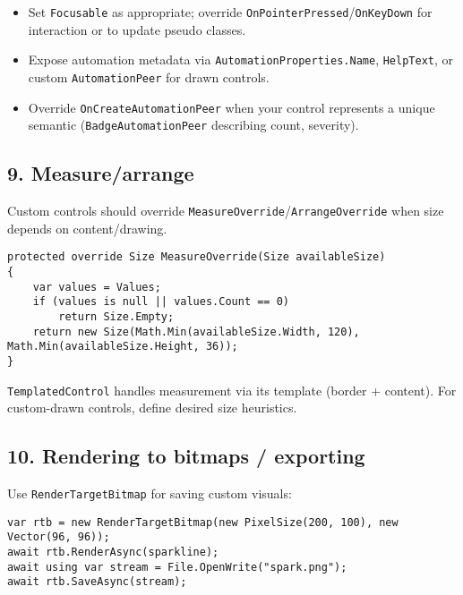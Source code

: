 \begin{itemize}
\tightlist
\item
  Set \passthrough{\lstinline!Focusable!} as appropriate; override
  \passthrough{\lstinline!OnPointerPressed!}/\passthrough{\lstinline!OnKeyDown!}
  for interaction or to update pseudo classes.
\item
  Expose automation metadata via
  \passthrough{\lstinline!AutomationProperties.Name!},
  \passthrough{\lstinline!HelpText!}, or custom
  \passthrough{\lstinline!AutomationPeer!} for drawn controls.
\item
  Override \passthrough{\lstinline!OnCreateAutomationPeer!} when your
  control represents a unique semantic
  (\passthrough{\lstinline!BadgeAutomationPeer!} describing count,
  severity).
\end{itemize}

\subsection{9. Measure/arrange}\label{measurearrange}

Custom controls should override
\passthrough{\lstinline!MeasureOverride!}/\passthrough{\lstinline!ArrangeOverride!}
when size depends on content/drawing.

\begin{lstlisting}
protected override Size MeasureOverride(Size availableSize)
{
    var values = Values;
    if (values is null || values.Count == 0)
        return Size.Empty;
    return new Size(Math.Min(availableSize.Width, 120), Math.Min(availableSize.Height, 36));
}
\end{lstlisting}

\passthrough{\lstinline!TemplatedControl!} handles measurement via its
template (border + content). For custom-drawn controls, define desired
size heuristics.

\subsection{10. Rendering to bitmaps /
exporting}\label{rendering-to-bitmaps-exporting}

Use \passthrough{\lstinline!RenderTargetBitmap!} for saving custom
visuals:

\begin{lstlisting}
var rtb = new RenderTargetBitmap(new PixelSize(200, 100), new Vector(96, 96));
await rtb.RenderAsync(sparkline);
await using var stream = File.OpenWrite("spark.png");
await rtb.SaveAsync(stream);
\end{lstlisting}


